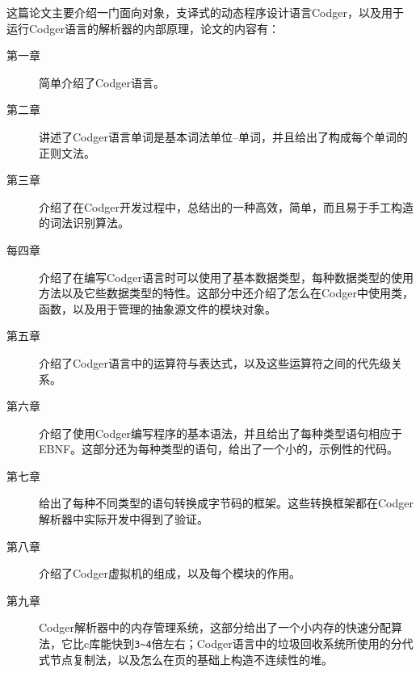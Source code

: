 \newline
这篇论文主要介绍一门面向对象，支译式的动态程序设计语言Codger，以及用于运行Codger语言的解析器的内部原理，论文的内容有：
\begin{description}
\item[第一章]简单介绍了Codger语言。
\item[第二章]讲述了Codger语言单词是基本词法单位--单词，并且给出了构成每个单词的正则文法。
\item[第三章]介绍了在Codger开发过程中，总结出的一种高效，简单，而且易于手工构造的词法识别算法。
\item[每四章]介绍了在编写Codger语言时可以使用了基本数据类型，每种数据类型的使用方法以及它些数据类型的特性。这部分中还介绍了怎么在Codger中使用类，函数，以及用于管理的抽象源文件的模块对象。
\item[第五章]介绍了Codger语言中的运算符与表达式，以及这些运算符之间的代先级关系。
\item[第六章]介绍了使用Codger编写程序的基本语法，并且给出了每种类型语句相应于EBNF。这部分还为每种类型的语句，给出了一个小的，示例性的代码。
\item[第七章]给出了每种不同类型的语句转换成字节码的框架。这些转换框架都在Codger解析器中实际开发中得到了验证。
\item[第八章]介绍了Codger虚拟机的组成，以及每个模块的作用。
\item[第九章]Codger解析器中的内存管理系统，这部分给出了一个小内存的快速分配算法，它比c库能快到\verb|3~4|倍左右；Codger语言中的垃圾回收系统所使用的分代式节点复制法，以及怎么在页的基础上构造不连续性的堆。
\end{description}

